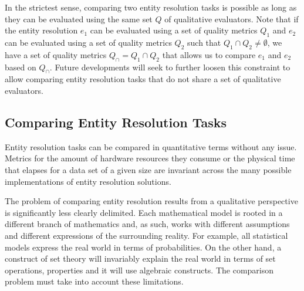 \documentclass[lettersize,journal]{IEEEtran}
\begin{document}
    In the strictest sense, comparing two entity resolution tasks is possible as
    long as they can be evaluated using the same set $Q$ of qualitative
    evaluators.
    Note that if the entity resolution $e_1$ can be evaluated using a set of
    quality metrics $Q_1$ and $e_2$ can be evaluated using a set of quality
    metrics $Q_2$ such that $Q_1 \cap Q_2 \neq \emptyset$, we have a set of
    quality metrics $Q_\cap = Q_1 \cap Q_2$ that allows us to compare $e_1$ and
    $e_2$ based on $Q_\cap$.
    Future developments will seek to further loosen this constraint to allow
    comparing entity resolution tasks that do not share a set of qualitative
    evaluators.

    \subsection[cert]{Comparing Entity Resolution Tasks}\label{subsec:cert}

    Entity resolution tasks can be compared in quantitative terms without any
    issue.
    Metrics for the amount of hardware resources they consume or the physical
    time that elapses for a data set of a given size are invariant across the
    many possible implementations of entity resolution solutions.

    The problem of comparing entity resolution results from a qualitative
    perspective is significantly less clearly delimited.
    Each mathematical model is rooted in a different branch of mathematics and,
    as such, works with different assumptions and different expressions of the
    surrounding reality.
    For example, all statistical models express the real world in terms of
    probabilities.
    On the other hand, a construct of set theory will invariably explain the
    real world in terms of set operations, properties and it will use algebraic
    constructs.
    The comparison problem must take into account these limitations.
\end{document}
